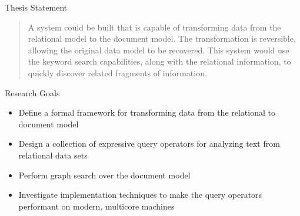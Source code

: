 \documentclass[compress]{beamer}
\begin{document}
	
	
		\begin{frame}{Thesis Statement}
			\begin{quotation}
				A system could be built that is capable of \alert{transforming data from the relational model to the document model}.  The transformation is \alert{reversible}, allowing the original data model to be recovered.  This system would use the \alert{keyword search} capabilities, along with the \alert{relational information}, to quickly \alert{discover related fragments of information}.
			\end{quotation}
		\end{frame}
		
		\begin{frame}{Research Goals}
			\begin{itemize}
				\item Define a \alert{formal framework} for transforming data from the relational to document model
				\item Design a collection of expressive \alert{query operators} for analyzing text from relational data sets
				\item Perform \alert{graph search} over the document model
				\item Investigate implementation techniques to make the query operators performant on modern, \alert{multicore machines}
			\end{itemize}
		\end{frame}
		
\end{document}
